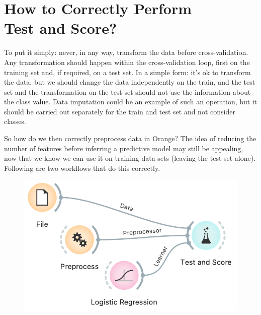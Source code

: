 \chapter{How to Correctly Perform \\ Test and Score?}
\label{ch:correct-cv}

To put it simply: never, in any way, transform the data before cross-validation. Any transformation should happen within the cross-validation loop, first on the training set and, if required, on a test set. In a simple form: it’s ok to transform the data, but we should change the data independently on the train, and the test set and the transformation on the test set should not use the information about the class value. Data imputation could be an example of such an operation, but it should be carried out separately for the train and test set and not consider classes.

So how do we then correctly preprocess data in Orange? The idea of reducing the number of features before inferring a predictive model may still be appealing, now that we know we can use it on training data sets (leaving the test set alone). Following are two workflows that do this correctly.

%
\begin{figure}[h]
    \centering
    \includegraphics[scale=0.5]{preprocessor-to-cv.png}
    \caption{$\;$}
\end{figure}

